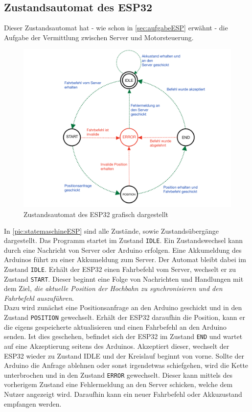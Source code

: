 \subsection{Zustandsautomat des ESP32}
\label{sec:stateESP}
Dieser Zustandsautomat hat - wie schon in \autoref{sec:aufgabeESP} erwähnt - die Aufgabe der Vermittlung zwischen Server und Motorsteuerung.

\begin{figure}[h]
	\begin{center}
		\includegraphics[width=16cm]{stateMaschineESP.pdf}
		\caption{\label{pic:statemaschineESP}Zustandsautomat des ESP32 grafisch dargestellt}
	\end{center}
\end{figure}

In \autoref{pic:statemaschineESP} sind alle Zustände, sowie Zustandsübergänge dargestellt. Das Programm startet im Zustand \texttt{IDLE}. Ein Zustandswechsel kann durch eine Nachricht von Server oder Arduino erfolgen. Eine Akkumeldung des Arduinos führt zu einer Akkumeldung zum Server. Der Automat bleibt dabei im Zustand \texttt{IDLE}.
Erhält der ESP32 einen Fahrbefehl vom Server, wechselt er zu Zustand \texttt{START}. Dieser beginnt eine Folge von Nachrichten und Handlungen mit dem Ziel, \textit{die aktuelle Position der Hochbahn zu synchronisieren und den Fahrbefehl auszuführen}. \\
Dazu wird zunächst eine Positionsanfrage an den Arduino geschickt und in den Zustand \texttt{POSITION} gewechselt. Erhält der ESP32 daraufhin die Position, kann er die eigens gespeicherte aktualisieren und einen Fahrbefehl an den Arduino senden. Ist dies geschehen, befindet sich der ESP32 im Zustand \texttt{END} und wartet auf eine Akzeptierung seitens des Arduinos. Akzeptiert dieser, wechselt der ESP32 wieder zu Zustand IDLE und der Kreislauf beginnt von vorne. Sollte der Arduino die Anfrage ablehnen oder sonst irgendetwas schiefgehen, wird die Kette unterbrochen und in den Zustand \texttt{ERROR} gewechselt. Dieser kann mittels des vorherigem Zustand eine Fehlermeldung an den Server schicken, welche dem Nutzer angezeigt wird. Daraufhin kann ein neuer Fahrbefehl oder Akkuzustand empfangen werden. 

